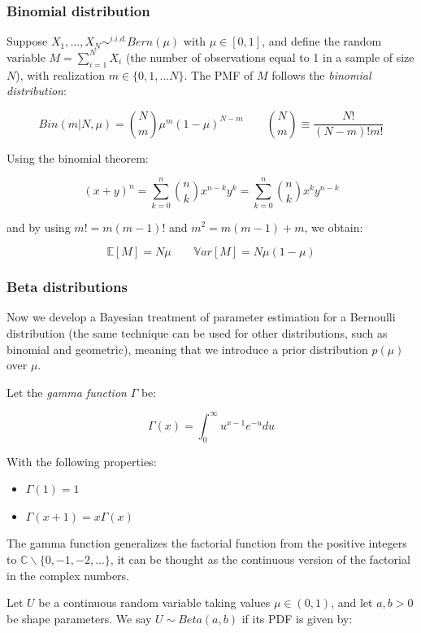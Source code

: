\documentclass{article}
\begin{document}
\subsubsection{Binomial distribution}\label{binomial-distribution}

Suppose \(X_1, ..., X_N \sim^{i.i.d.} Bern(\mu)\) with
\(\mu \in [0, 1]\), and define the random variable
\(M = \sum_{i=1}^N X_i\) (the number of observations equal to 1 in a
sample of size \(N\)), with realization \(m \in \{0, 1, ... N\}\). The
PMF of \(M\) follows the \emph{binomial distribution}:

\[Bin(m|N, \mu) = \binom{N}{m} \mu^m(1-\mu)^{N-m} \qquad \binom{N}{m} \equiv
\frac{N!}{(N-m)!m!}\]

Using the binomial theorem:

\[(x+y)^n = \sum_{k=0}^n \binom{n}{k} x^{n-k} y^k = \sum_{k=0}^n \binom{n}{k}
x^k y^{n-k}\]

and by using \(m! = m (m-1)!\) and \(m^2 = m(m - 1) + m\), we obtain:

\[\mathbb{E}[M] = N \mu \qquad \mathbb{V}ar[M] = N \mu (1-\mu )\]

\subsubsection{Beta distributions}\label{beta-distributions}

Now we develop a Bayesian treatment of parameter estimation for a
Bernoulli distribution (the same technique can be used for other
distributions, such as binomial and geometric), meaning that we
introduce a prior distribution \(p(\mu)\) over \(\mu\).

Let the \emph{gamma function} \(\Gamma\) be:

\[\Gamma (x) = \int_0^{\infty} u^{x-1}e^{-u}du\]

With the following properties:

\begin{itemize}
\item
  \(\Gamma (1) = 1\)
\item
  \(\Gamma (x+1) = x \Gamma (x)\)
\end{itemize}

The gamma function generalizes the factorial function from the positive
integers to \(\mathbb{C} \backslash \{0, -1, -2, ...\}\), it can be
thought as the continuous version of the factorial in the complex
numbers.

Let \(U\) be a continuous random variable taking values
\(\mu \in (0, 1)\), and let \(a, b >0\) be shape parameters. We say
\(U \sim Beta(a, b)\) if its PDF is given by:
\end{document}
